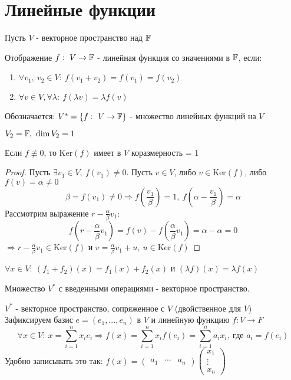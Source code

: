 \section{Линейные функции}
    Пусть $V$ - векторное пространство над $\mathbb F$
    \begin{definition}
        Отображение $f: \ V \to \mathbb F$ - линейная функция со значениями в $\mathbb F$, если:
        \begin{enumerate}
            \item $\forall v_1, \ v_2 \in V: \ f(v_1 + v_2) = f(v_1) = f(v_2)$
            \item $\forall v \in V, \forall \lambda : \ f(\lambda v) = \lambda f(v)$  
        \end{enumerate}
        Обозначается: $V^{*} = \{f : \ V \to \mathbb F\}$ - множество линейных функций на $V$  
    \end{definition}
    \begin{remark}
        $V_2 = \mathbb F, \ \dim V_2 = 1$ 
    \end{remark}
    \begin{lemma}
        Если $f \not \equiv 0$, то $\text{Ker}(f)$ имеет в $V$ коразмерность = 1 
    \end{lemma} 
    \begin{proof}
        Пусть $\exists v_1 \in V, \ f(v_1) \neq 0$. Пусть $v \in V$, либо $v \in \text{Ker}(f)$, либо $f(v) = \alpha \neq 0$ 
        $$\beta = f(v_1) \neq 0 \Longrightarrow f(\frac{v_1}{\beta}) = 1, \ f(\alpha - \frac{v_1}{\beta}) = \alpha$$
        Рассмотрим выражение $r - \frac{\alpha}{\beta}v_1$:
        $$f(r - \frac{\alpha}{\beta}v_1) = f(v) - f(\frac{\alpha}{\beta}v_1) = \alpha - \alpha = 0$$
        $\Longrightarrow r - \frac{\alpha}{\beta}v_1 \in \text{Ker}(f)$ и $v = \frac{\alpha}{\beta}v_1 + u, \ u \in \text{Ker}(f)$  
    \end{proof}
    \begin{remark}
        $\forall x \in V: \ (f_1 + f_2)(x) = f_1(x) + f_2(x)$  и $(\lambda f)(x) = \lambda f (x)$ 
    \end{remark}
    \begin{lemma}
        Множество $V^{*}$ с введенными операциями - векторное пространство. 
    \end{lemma}
    \begin{definition}
        $V^{*}$ - векторное пространство, сопряженное с $V$ (двойственное для $V$)\\
        Зафиксируем базис $e = (e_1, ..., e_n)$ в $V$ и линейную функцию $f:V \rightarrow F$
        $$\forall x \in V: \ x = \sum \limits_{i=1}^n x_i e_i \Rightarrow f(x) = \sum \limits_{i=1}^n x_i f(e_i) = \sum \limits_{i=1}^n a_i x_i, \ \text{где } a_i = f(e_i)$$ 
        Удобно записывать это так: $f(x) = \begin{pmatrix}
            a_1 & \cdots & a_n
        \end{pmatrix}\begin{pmatrix} x_1 \\ \vdots \\ x_n \end{pmatrix}$
    \end{definition} 
    
